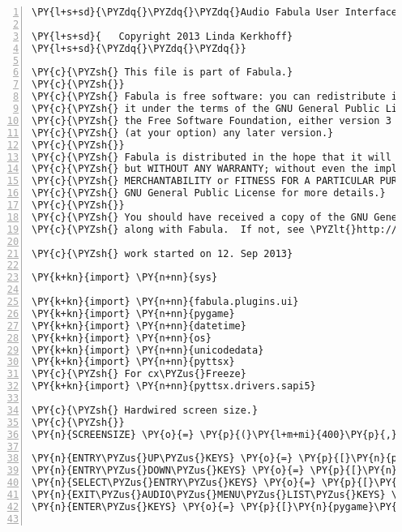 \begin{Verbatim}[commandchars=\\\{\},numbers=left,firstnumber=1,stepnumber=1]
\PY{l+s+sd}{\PYZdq{}\PYZdq{}\PYZdq{}Audio Fabula User Interface using Pygame and Pyttsx}

\PY{l+s+sd}{   Copyright 2013 Linda Kerkhoff}
\PY{l+s+sd}{\PYZdq{}\PYZdq{}\PYZdq{}}

\PY{c}{\PYZsh{} This file is part of Fabula.}
\PY{c}{\PYZsh{}}
\PY{c}{\PYZsh{} Fabula is free software: you can redistribute it and/or modify}
\PY{c}{\PYZsh{} it under the terms of the GNU General Public License as published by}
\PY{c}{\PYZsh{} the Free Software Foundation, either version 3 of the License, or}
\PY{c}{\PYZsh{} (at your option) any later version.}
\PY{c}{\PYZsh{}}
\PY{c}{\PYZsh{} Fabula is distributed in the hope that it will be useful,}
\PY{c}{\PYZsh{} but WITHOUT ANY WARRANTY; without even the implied warranty of}
\PY{c}{\PYZsh{} MERCHANTABILITY or FITNESS FOR A PARTICULAR PURPOSE.  See the}
\PY{c}{\PYZsh{} GNU General Public License for more details.}
\PY{c}{\PYZsh{}}
\PY{c}{\PYZsh{} You should have received a copy of the GNU General Public License}
\PY{c}{\PYZsh{} along with Fabula.  If not, see \PYZlt{}http://www.gnu.org/licenses/\PYZgt{}.}

\PY{c}{\PYZsh{} work started on 12. Sep 2013}

\PY{k+kn}{import} \PY{n+nn}{sys}

\PY{k+kn}{import} \PY{n+nn}{fabula.plugins.ui}
\PY{k+kn}{import} \PY{n+nn}{pygame}
\PY{k+kn}{import} \PY{n+nn}{datetime}
\PY{k+kn}{import} \PY{n+nn}{os}
\PY{k+kn}{import} \PY{n+nn}{unicodedata}
\PY{k+kn}{import} \PY{n+nn}{pyttsx}
\PY{c}{\PYZsh{} For cx\PYZus{}Freeze}
\PY{k+kn}{import} \PY{n+nn}{pyttsx.drivers.sapi5}

\PY{c}{\PYZsh{} Hardwired screen size.}
\PY{c}{\PYZsh{}}
\PY{n}{SCREENSIZE} \PY{o}{=} \PY{p}{(}\PY{l+m+mi}{400}\PY{p}{,} \PY{l+m+mi}{300}\PY{p}{)}

\PY{n}{ENTRY\PYZus{}UP\PYZus{}KEYS} \PY{o}{=} \PY{p}{[}\PY{n}{pygame}\PY{o}{.}\PY{n}{K\PYZus{}UP}\PY{p}{]}
\PY{n}{ENTRY\PYZus{}DOWN\PYZus{}KEYS} \PY{o}{=} \PY{p}{[}\PY{n}{pygame}\PY{o}{.}\PY{n}{K\PYZus{}DOWN}\PY{p}{]}
\PY{n}{SELECT\PYZus{}ENTRY\PYZus{}KEYS} \PY{o}{=} \PY{p}{[}\PY{n}{pygame}\PY{o}{.}\PY{n}{K\PYZus{}RIGHT}\PY{p}{,} \PY{n}{pygame}\PY{o}{.}\PY{n}{K\PYZus{}RETURN}\PY{p}{]}
\PY{n}{EXIT\PYZus{}AUDIO\PYZus{}MENU\PYZus{}LIST\PYZus{}KEYS} \PY{o}{=} \PY{p}{[}\PY{n}{pygame}\PY{o}{.}\PY{n}{K\PYZus{}LEFT}\PY{p}{]}
\PY{n}{ENTER\PYZus{}KEYS} \PY{o}{=} \PY{p}{[}\PY{n}{pygame}\PY{o}{.}\PY{n}{K\PYZus{}RETURN}\PY{p}{]}


\end{Verbatim}
